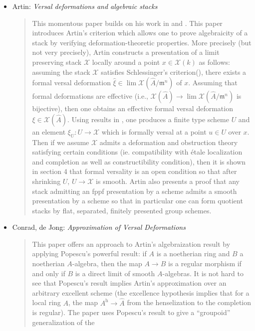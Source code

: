 \begin{itemize}
\begin{quote}
\end{quote}
\item
Artin: \emph{Versal deformations and algebraic stacks} \cite{ArtinVersal}
\begin{quote}
This momentous paper builds on his work in
\cite{Artin-Algebraic-Approximation} and \cite{ArtinI}. This paper
introduces Artin's criterion which allows one to prove algebraicity of a
stack by verifying deformation-theoretic properties. More precisely (but
not very precisely), Artin constructs a presentation of a limit preserving
stack $\mathcal{X}$
locally around a point $x \in \mathcal{X}(k)$ as follows: assuming the stack
$\mathcal{X}$
satisfies Schlessinger's criterion(\cite{Sch}), there exists a formal
versal deformation
$\hat{\xi} \in \lim \mathcal{X}(\hat A / \mathfrak m^n)$ of
$x$. Assuming that formal deformations are effective (i.e.,
$\mathcal{X}(\hat{A}) \to \lim \mathcal{X}(\hat A / \mathfrak m^n)$
is bijective), then one obtains an effective formal versal
deformation $\xi \in \mathcal{X}(\hat A)$. Using results in
\cite{ArtinI}, one produces a finite type scheme $U$ and an
element $\xi_U: U \to \mathcal{X}$ which is formally versal at a point
$u \in U$ over $x$. Then if we assume $\mathcal{X}$ admits a deformation
and obstruction theory
satisfying certain conditions (ie. compatibility with \'etale localization and
completion as well as constructibility condition), then it is shown in section
4 that formal versality is an open condition so that after shrinking $U$, $U
\to \mathcal{X}$ is smooth.
Artin also presents a proof that any stack admitting an fppf presentation by
a scheme admits a smooth presentation by a scheme so that in particular
one can form quotient stacks by flat, separated, finitely presented group
schemes.
\end{quote}
\item Conrad, de Jong: \emph{Approximation of Versal Deformations}
\cite{conrad-dejong}
\begin{quote}
This paper offers an approach to Artin's algebraization result by applying
Popescu's powerful result: if $A$ is a noetherian ring and $B$ a noetherian
$A$-algebra, then the map $A \to B$ is a regular morphism if and only if $B$
is a direct limit of smooth $A$-algebras. It is not hard to see that Popescu's
result implies Artin's approximation over an arbitrary excellent scheme (the
excellence hypothesis implies that for a local ring $A$, the map
$A^{\text{h}} \to \hat A$ from the henselization to the completion is regular).
The paper uses Popescu's result to give a ``groupoid'' generalization of the

\end{quote}
\end{itemize}
